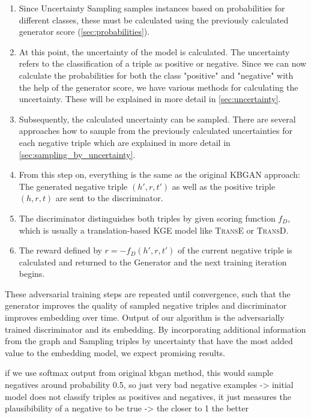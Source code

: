 \begin{enumerate}
    \item Since Uncertainty Sampling samples instances based on probabilities for different classes, these must be calculated using the previously calculated generator score (\autoref{sec:probabilities}).

    \item At this point, the uncertainty of the model is calculated.
    The uncertainty refers to the classification of a triple as positive or negative.
    Since we can now calculate the probabilities for both the class "positive" and "negative" with the help of the generator score, we have various methods for calculating the uncertainty.
    These will be explained in more detail in \autoref{sec:uncertainty}.
    
    \item Subsequently, the calculated uncertainty can be sampled.
    There are several approaches how to sample from the previously calculated uncertainties for each negative triple which are explained in more detail in \autoref{sec:sampling_by_uncertainty}.
    
     \item 
    From this step on, everything is the same as the original \ac{KBGAN} approach:
    The generated negative triple $(h',r,t')$ as well as the positive triple $(h, r, t)$ are sent to the discriminator.
    
    \item 
    The discriminator distinguishes both triples by given scoring function $f_D$, which is usually a translation-based \ac{KGE} model like \textsc{TransE} or \textsc{TransD}.
    
    \item 
    The reward defined by $r = - f_D(h',r,t')$ of the current negative triple is calculated and returned to the Generator and the next training iteration begins.
\end{enumerate}
These adversarial training steps are repeated until convergence, such that the generator improves the quality of sampled negative triples and discriminator improves embedding over time.
Output of our algorithm is the adversarially trained discriminator and its embedding.
By incorporating additional information from the graph and Sampling triples by uncertainty that have the most added value to the embedding model, we expect promising results.



if we use softmax output from original kbgan method, this would sample negatives around probability 0.5, so just very bad negative examples
-> initial model does not classify triples as positives and negatives, it just measures the plausibibility of a negative to be true
-> the closer to 1 the better
